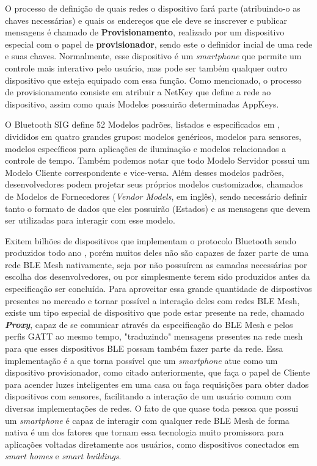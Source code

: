 \documentclass[../monografia.tex]{subfiles}
\begin{document}
O processo de definição de quais redes o dispositivo fará parte (atribuindo-o as chaves necessárias) e quais os endereços que ele deve se inscrever e publicar mensagens é chamado de \textbf{Provisionamento}, realizado por um dispositivo especial com o papel de \textbf{provisionador}, sendo este o definidor incial de uma rede e suas chaves. Normalmente, esse dispositivo é um \textit{smartphone} que permite um controle mais interativo pelo usuário, mas pode ser também qualquer outro dispositivo que esteja equipado com essa função. Como mencionado, o processo de provisionamento consiste em atribuir a NetKey que define a rede ao dispositivo, assim como quais Modelos possuirão determinadas AppKeys.

O Bluetooth SIG define 52 Modelos padrões, listados e especificados em \cite{BLE-mesh}, divididos em quatro grandes grupos: modelos genéricos, modelos para sensores, modelos específicos para aplicações de iluminação e modelos relacionados a controle de tempo. Também podemos notar que todo Modelo Servidor possui um Modelo Cliente correspondente e vice-versa. Além desses modelos padrões, desenvolvedores podem projetar seus próprios modelos customizados, chamados de Modelos de Fornecedores (\textit{Vendor Models}, em inglês), sendo necessário definir tanto o formato de dados que eles possuirão (Estados) e as mensagens que devem ser utilizadas para interagir com esse modelo.

Exitem bilhões de dispositivos que implementam o protocolo Bluetooth sendo produzidos todo ano \cite{ble-market-update}, porém muitos deles não são capazes de fazer parte de uma rede BLE Mesh nativamente, seja por não possuírem as camadas necessárias por escolha dos desenvolvedores, ou por simplesmente terem sido produzidos antes da especificação ser concluída. Para aproveitar essa grande quantidade de dispostivos presentes no mercado e tornar possível a interação deles com redes BLE Mesh, existe um tipo especial de dispositivo que pode estar presente na rede, chamado \textit{\textbf{Proxy}}, capaz de se comunicar através da especificação do BLE Mesh e pelos perfis GATT \cite{BLE-GATT} ao mesmo tempo, "traduzindo" mensagens presentes na rede mesh para que esses dispositivos BLE possam também fazer parte da rede. Essa implementação é a que torna possível que um \textit{smartphone} atue como um dispositivo provisionador, como citado anteriormente, que faça o papel de Cliente para acender luzes inteligentes em uma casa ou faça requisições para obter dados dispositivos com sensores, facilitando a interação de um usuário comum com diversas implementações de redes. O fato de que quase toda pessoa que possui um \textit{smartphone} é capaz de interagir com qualquer rede BLE Mesh de forma nativa é um dos fatores que tornam essa tecnologia muito promissora para aplicações voltadas diretamente aos usuários, como dispositivos conectados em \textit{smart homes} e \textit{smart buildings}.
\end{document}
